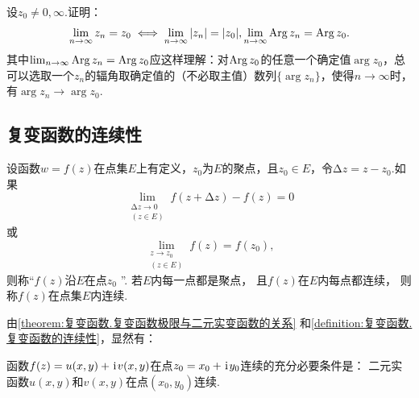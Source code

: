 \begin{example}
设\(z_0\neq0,\infty\).证明：\begin{equation*}
\lim_{n\to\infty} z_n = z_0
\iff
\lim_{n\to\infty} \abs{z_n} = \abs{z_0},
\lim_{n\to\infty} \operatorname{Arg} z_n = \operatorname{Arg} z_0.
\end{equation*}其中\(\lim_{n\to\infty} \operatorname{Arg} z_n = \operatorname{Arg} z_0\)应这样理解：对\(\operatorname{Arg} z_0\)的任意一个确定值\(\arg z_0\)，总可以选取一个\(z_n\)的辐角取确定值的（不必取主值）数列\(\{ \arg z_n \}\)，使得\(n\to\infty\)时，有\(\arg z_n \to \arg z_0\).
\end{example}

\subsection{复变函数的连续性}
\begin{definition}\label{definition:复变函数.复变函数的连续性}
设函数\(w=f(z)\)在点集\(E\)上有定义，\(z_0\)为\(E\)的聚点，且\(z_0 \in E\)，令\(\increment z = z - z_0\).如果\begin{equation*}
\lim_{\substack{\increment z\to0 \\ (z \in E)}} f(z+\increment z) - f(z) = 0
\end{equation*}或\begin{equation*}
\lim_{\substack{z \to z_0 \\ (z \in E)}} f(z) = f(z_0),
\end{equation*}
则称“\(f(z)\)沿\(E\)在点\(z_0\) ”.
若\(E\)内每一点都是聚点，
且\(f(z)\)在\(E\)内每点都连续，
则称\(f(z)\)在点集\(E\)内连续.
\end{definition}

由\cref{theorem:复变函数.复变函数极限与二元实变函数的关系} 和\cref{definition:复变函数.复变函数的连续性}，显然有：
\begin{theorem}
函数\(f(z)=u(x,y)+\kern1pt\mathrm{i}\kern1pt v(x,y)\)在点\(z_0=x_0+\kern1pt\mathrm{i}\kern1pt y_0\)连续的充分必要条件是：
二元实函数\(u(x,y)\)和\(v(x,y)\)在点\((x_0,y_0)\)连续.
\end{theorem}

